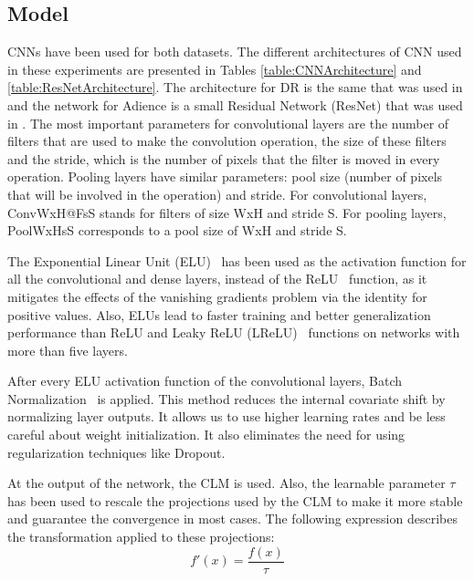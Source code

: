 \documentclass[journal]{IEEEtran}
\begin{document}
	\subsection{Model}
	\label{sect:model}
	CNNs have been used for both datasets. The different architectures of CNN used in these experiments are presented in Tables \ref{table:CNNArchitecture} and \ref{table:ResNetArchitecture}. The architecture for DR is the same that was used in \cite{de2018weighted} and the network for Adience is a small Residual Network (ResNet) \cite{he2016deep} that was used in \cite{beckham2017unimodal}. The most important parameters for convolutional layers are the number of filters that are used to make the convolution operation, the size of these filters and the stride, which is the number of pixels that the filter is moved in every operation. Pooling layers have similar parameters: pool size (number of pixels that will be involved in the operation) and stride. For convolutional layers, ConvWxH@FsS stands for filters of size WxH and stride S. For pooling layers, PoolWxHsS corresponds to a pool size of WxH and stride S.
	
	The Exponential Linear Unit (ELU)~\cite{clevert2015fast} has been used as the activation function for all the convolutional and dense layers, instead of the ReLU~\cite{nair2010rectified} function, as it mitigates the effects of the vanishing gradients problem \cite{bengio1994learning,pascanu2013difficulty} via the identity for positive values. Also, ELUs lead to faster training and better generalization performance than ReLU and Leaky ReLU (LReLU)~\cite{maas2013rectifier} functions on networks with more than five layers.
	
	After every ELU activation function of the convolutional layers, Batch Normalization~\cite{ioffe2015batch} is applied. This method reduces the internal covariate shift by normalizing layer outputs. It allows us to use higher learning rates and be less careful about weight initialization. It also eliminates the need for using regularization techniques like Dropout.
	
	At the output of the network, the CLM is used. Also, the learnable parameter $\tau$ has been used to rescale the projections used by the CLM to make it more stable and guarantee the convergence in most cases. The following expression describes the transformation applied to these projections:
	\begin{equation}
		\nonumber
		f'(x) = \frac{f(x)}{\tau}
	\end{equation}
	
\end{document}
